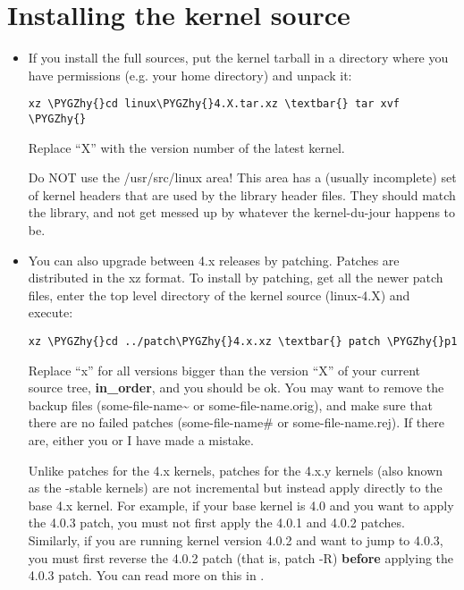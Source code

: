 \documentclass[a4paper,8pt,english]{sphinxmanual}
\def\PYGZhy{\char`\-}
\begin{document}
\section{Installing the kernel source}
\label{admin-guide/README:installing-the-kernel-source}\begin{itemize}
\item {} 
If you install the full sources, put the kernel tarball in a
directory where you have permissions (e.g. your home directory) and
unpack it:

\begin{Verbatim}[commandchars=\\\{\}]
xz \PYGZhy{}cd linux\PYGZhy{}4.X.tar.xz \textbar{} tar xvf \PYGZhy{}
\end{Verbatim}

Replace ``X'' with the version number of the latest kernel.

Do NOT use the /usr/src/linux area! This area has a (usually
incomplete) set of kernel headers that are used by the library header
files.  They should match the library, and not get messed up by
whatever the kernel-du-jour happens to be.

\item {} 
You can also upgrade between 4.x releases by patching.  Patches are
distributed in the xz format.  To install by patching, get all the
newer patch files, enter the top level directory of the kernel source
(linux-4.X) and execute:

\begin{Verbatim}[commandchars=\\\{\}]
xz \PYGZhy{}cd ../patch\PYGZhy{}4.x.xz \textbar{} patch \PYGZhy{}p1
\end{Verbatim}

Replace ``x'' for all versions bigger than the version ``X'' of your current
source tree, \textbf{in\_order}, and you should be ok.  You may want to remove
the backup files (some-file-name\textasciitilde{} or some-file-name.orig), and make sure
that there are no failed patches (some-file-name\# or some-file-name.rej).
If there are, either you or I have made a mistake.

Unlike patches for the 4.x kernels, patches for the 4.x.y kernels
(also known as the -stable kernels) are not incremental but instead apply
directly to the base 4.x kernel.  For example, if your base kernel is 4.0
and you want to apply the 4.0.3 patch, you must not first apply the 4.0.1
and 4.0.2 patches. Similarly, if you are running kernel version 4.0.2 and
want to jump to 4.0.3, you must first reverse the 4.0.2 patch (that is,
patch -R) \textbf{before} applying the 4.0.3 patch. You can read more on this in
.


\end{itemize}
\end{document}
